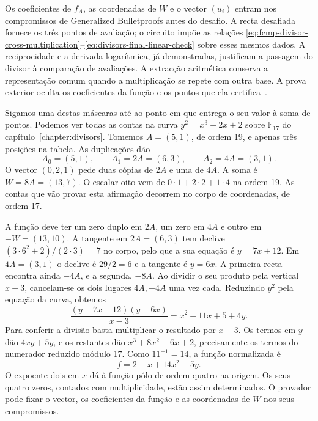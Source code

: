 Os coeficientes de \(f_A\), as coordenadas de \(W\) e o
vector \((u_i)\) entram nos compromissos de Generalized
Bulletproofs antes do desafio. A recta desafiada fornece os
três pontos de avaliação; o circuito impõe as relações
\eqref{eq:fcmp-divisor-cross-multiplication}--\eqref{eq:divisors-final-linear-check}
sobre esses mesmos dados. A reciprocidade e a derivada
logarítmica, já demonstradas, justificam a passagem do divisor
à comparação de avaliações. A extracção aritmética conserva
a representação comum quando a multiplicação se repete com
outra base. A prova exterior oculta os coeficientes da função
e os pontos que ela certifica~\cite{fcmp-plus-plus-paper,monero-oxide-fcmp-source}.


Sigamos uma destas máscaras até ao ponto em que entrega o seu valor
à soma de pontos. Podemos ver todas as contas na curva
\(y^2=x^3+2x+2\) sobre \(\mathbb F_{17}\) do
capítulo~\ref{chapter:divisors}. Tomemos \(A=(5,1)\), de ordem 19,
e apenas três posições na tabela. As duplicações dão
\[
 A_0=(5,1),\qquad A_1=2A=(6,3),\qquad A_2=4A=(3,1).
\]
O vector \((0,2,1)\) pede duas cópias de \(2A\) e uma de \(4A\).
A soma é \(W=8A=(13,7)\). O escalar oito vem de
\(0\cdot1+2\cdot2+1\cdot4\) na ordem 19. As contas que vão provar
esta afirmação decorrem no corpo de coordenadas, de ordem 17.

A função deve ter um zero duplo em \(2A\), um zero em \(4A\) e outro
em \(-W=(13,10)\). A tangente em \(2A=(6,3)\) tem declive
\((3\cdot6^2+2)/(2\cdot3)=7\) no corpo, pelo que a sua equação é
\(y=7x+12\). Em \(4A=(3,1)\) o declive é \(29/2=6\) e a
tangente é \(y=6x\). A primeira recta encontra ainda \(-4A\), e a
segunda, \(-8A\). Ao dividir o seu produto pela vertical \(x-3\),
cancelam-se os dois lugares \(4A,-4A\) uma vez cada. Reduzindo
\(y^2\) pela equação da curva, obtemos
\[
 \frac{(y-7x-12)(y-6x)}{x-3}
       =x^2+11x+5+4y.
\]
Para conferir a divisão basta multiplicar o resultado por \(x-3\).
Os termos em \(y\) dão \(4xy+5y\), e os restantes dão
\(x^3+8x^2+6x+2\), precisamente os termos do numerador reduzido
módulo 17. Como \(11^{-1}=14\), a função normalizada é
\[
 f=2+x+14x^2+5y.
\]
O expoente dois em \(x\) dá à função pólo de ordem quatro na
origem. Os seus quatro zeros, contados com multiplicidade, estão
assim determinados. O provador pode fixar o vector, os coeficientes da
função e as coordenadas de \(W\) nos seus compromissos.


